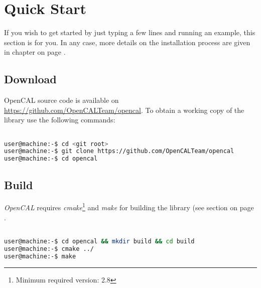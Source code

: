 \chapter{Quick Start}

If you wish to get started by just typing a few lines and running
an example, this section is for you. In any case, more details on
the installation process are given in chapter  on page
\pageref{ch:installation}.

\section{Download}
OpenCAL source code is available on
\url{https://github.com/OpenCALTeam/opencal}. To obtain a working copy of the
library use the following commands:

\begin{lstlisting}[language=bash,caption={OpenCAL download}]

user@machine:-$ cd <git root>
user@machine:-$ git clone https://github.com/OpenCALTeam/opencal
user@machine:-$ cd opencal
\end{lstlisting}

\section{Build}
\textit{OpenCAL} requires \textit{cmake}\footnote{Minimum required version: 2.8}
and \textit{make} for building the library (see section
 on page \pageref{ch:installation:sect:build} .  

 \begin{lstlisting}[language=bash,caption={OpenCAL download}]

user@machine:-$ cd opencal && mkdir build && cd build
user@machine:-$ cmake ../
user@machine:-$ make
\end{lstlisting}
